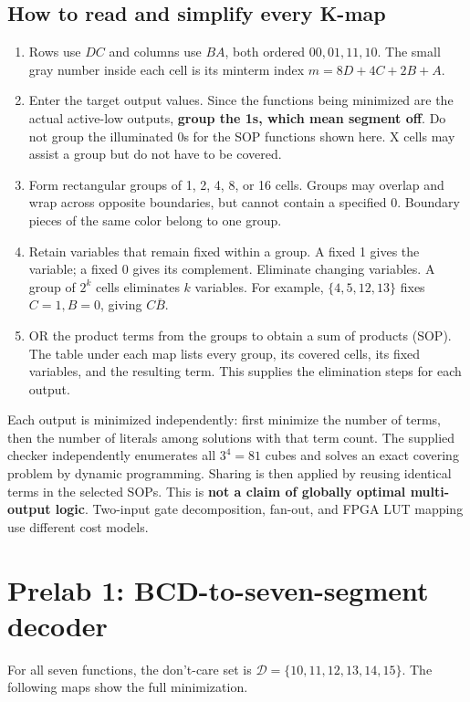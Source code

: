 \documentclass[a4paper,11pt]{article}
\begin{document}
\clearpage\subsection{How to read and simplify every K-map}
\begin{enumerate}
\item Rows use $DC$ and columns use $BA$, both ordered $00,01,11,10$. The small gray
number inside each cell is its minterm index $m=8D+4C+2B+A$.
\item Enter the target output values. Since the functions being minimized are the
actual active-low outputs, \textbf{group the 1s, which mean segment off}. Do not group
the illuminated 0s for the SOP functions shown here. X cells may assist a group but
do not have to be covered.
\item Form rectangular groups of 1, 2, 4, 8, or 16 cells. Groups may overlap and wrap
across opposite boundaries, but cannot contain a specified 0. Boundary pieces of the
same color belong to one group.
\item Retain variables that remain fixed within a group. A fixed 1 gives the variable;
a fixed 0 gives its complement. Eliminate changing variables. A group of $2^k$ cells
eliminates $k$ variables. For example, $\{4,5,12,13\}$ fixes $C=1,B=0$, giving
$C\overline B$.
\item OR the product terms from the groups to obtain a sum of products (SOP). The table
under each map lists every group, its covered cells, its fixed variables, and the
resulting term. This supplies the elimination steps for each output.
\end{enumerate}

Each output is minimized independently: first minimize the number of terms, then the
number of literals among solutions with that term count. The supplied checker
independently enumerates all $3^4=81$ cubes and solves an exact covering problem by
dynamic programming. Sharing is then applied by reusing identical terms in the selected
SOPs. This is \textbf{not a claim of globally optimal multi-output logic}. Two-input gate
decomposition, fan-out, and FPGA LUT mapping use different cost models.

\clearpage\section{Prelab 1: BCD-to-seven-segment decoder}
For all seven functions, the don't-care set is
$\mathcal D=\{10,11,12,13,14,15\}$. The following maps show the full minimization.
\end{document}
